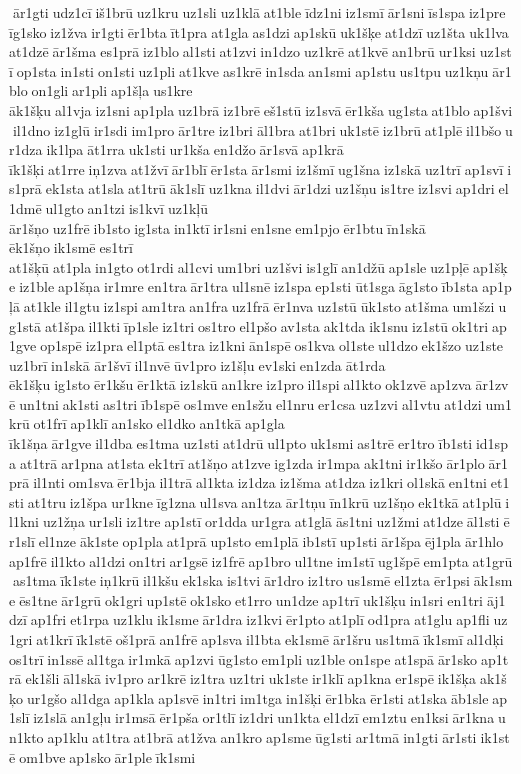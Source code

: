 ār1gti udz1cī iš1brū uz1kru uz1sli uz1klā at1ble īdz1ni iz1smī ār1sni īs1spa iz1pre īg1sko iz1žva ir1gti ēr1bta īt1pra at1gla as1dzi ap1skū uk1šķe at1dzī uz1šta uk1lva at1dzē ār1šma es1prā iz1blo al1sti at1zvi in1dzo uz1krē at1kvē an1brū ur1ksi uz1stī op1sta in1sti on1sti uz1pli at1kve as1krē in1sda an1smi ap1stu us1tpu uz1kņu ār1blo on1gli ar1pli ap1šļa us1kre 	āk1šķu al1vja iz1sni ap1pla uz1brā iz1brē eš1stū iz1svā ēr1kša ug1sta at1blo ap1švi il1dno iz1glū ir1sdi im1pro ār1tre iz1bri āl1bra at1bri uk1stē iz1brū at1plē il1bšo ur1dza ik1lpa āt1rra uk1sti ur1kša en1džo ār1svā ap1krā 	īk1šķi at1rre iņ1zva at1žvī ār1blī ēr1sta ār1smi iz1šmī ug1šna iz1skā uz1trī ap1svī is1prā ek1sta at1sla at1trū āk1slī uz1kna il1dvi ār1dzi uz1šņu is1tre iz1svi ap1dri el1dmē ul1gto an1tzi is1kvī uz1kļū 	ār1šņo uz1frē ib1sto ig1sta in1ktī ir1sni en1sne em1pjo ēr1btu īn1skā 	ēk1šņo ik1smē es1trī 	at1šķū at1pla in1gto ot1rdi al1cvi um1bri uz1švi is1glī an1džū ap1sle uz1pļē ap1šķe iz1ble ap1šņa ir1mre en1tra ār1tra ul1snē iz1spa ep1sti ūt1sga āg1sto īb1sta ap1pļā at1kle il1gtu iz1spi am1tra an1fra uz1frā ēr1nva uz1stū ūk1sto at1šma um1šzi ug1stā at1špa il1kti īp1sle iz1tri os1tro el1pšo av1sta ak1tda ik1snu iz1stū ok1tri ap1gve op1spē iz1pra el1ptā es1tra iz1kni ān1spē os1kva ol1ste ul1dzo ek1šzo uz1ste uz1brī in1skā 	ār1švī il1nvē ūv1pro iz1šļu ev1ski en1zda āt1rda 	ēk1šķu ig1sto ēr1kšu ēr1ktā iz1skū an1kre iz1pro il1spi al1kto ok1zvē ap1zva ār1zvē un1tni ak1sti as1tri īb1spē os1mve en1sžu el1nru er1csa uz1zvi al1vtu at1dzi um1krū ot1frī ap1klī an1sko el1dko an1tkā ap1gla 	īk1šņa ār1gve il1dba es1tma uz1sti at1drū ul1pto uk1smi as1trē er1tro īb1sti id1spa at1trā ar1pna at1sta ek1trī at1šņo at1zve ig1zda ir1mpa ak1tni ir1kšo ār1plo ār1prā il1nti om1sva ēr1bja il1trā al1kta iz1dza iz1šma at1dza iz1kri ol1skā en1tni et1sti at1tru iz1špa ur1kne īg1zna ul1sva an1tza ār1tņu īn1krū uz1šņo ek1tkā at1plū il1kni uz1žņa ur1sli iz1tre ap1stī or1dda ur1gra at1glā ās1tni uz1žmi at1dze āl1sti ēr1slī el1nze āk1ste op1pla at1prā up1sto em1plā ib1stī up1sti ār1špa ēj1pla ār1hlo ap1frē il1kto al1dzi on1tri ar1gsē iz1frē ap1bro ul1tne im1stī ug1špē em1pta at1grū as1tma īk1ste iņ1krū il1kšu ek1ska is1tvi ār1dro iz1tro us1smē el1zta ēr1psi āk1sme ēs1tne ār1grū ok1gri up1stē ok1sko et1rro un1dze ap1trī uk1šķu in1sri en1tri āj1dzī ap1fri et1rpa uz1klu ik1sme ār1dra iz1kvi ēr1pto at1plī od1pra at1glu ap1fli uz1gri at1krī īk1stē oš1prā an1frē ap1sva il1bta ek1smē ār1šru us1tmā īk1smī al1dķi os1trī in1ssē al1tga ir1mkā ap1zvi ūg1sto em1pli uz1ble on1spe at1spā ār1sko ap1trā ek1šli āl1skā iv1pro ar1krē iz1tra uz1tri uk1ste ir1klī ap1kna er1spē ik1šķa ak1šķo ur1gšo al1dga ap1kla ap1svē in1tri im1tga in1šķi ēr1bka ēr1sti at1ska āb1sle ap1slī iz1slā an1gļu ir1msā ēr1pša or1tlī iz1dri un1kta el1dzī em1ztu en1ksi ār1kna un1kto ap1klu at1tra at1brā at1žva an1kro ap1sme ūg1sti ar1tmā in1gti ār1sti ik1stē om1bve ap1sko ār1ple īk1smi 